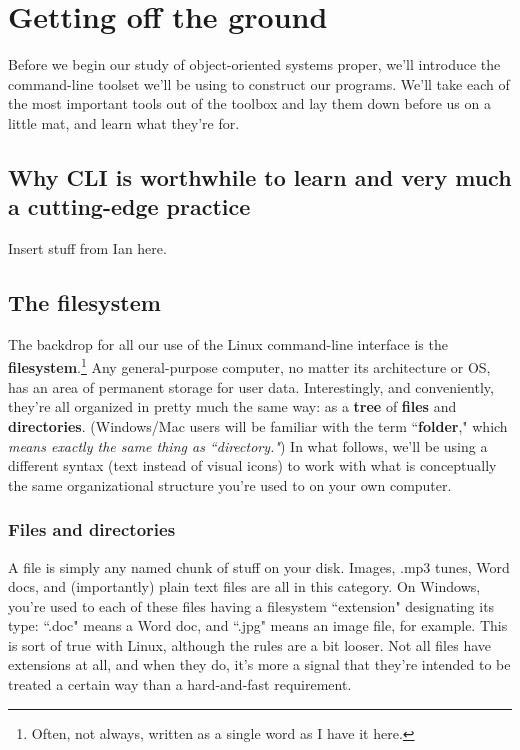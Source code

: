 
\chapter{Getting off the ground}

Before we begin our study of object-oriented systems proper, we'll introduce
the command-line toolset we'll be using to construct our programs. We'll take
each of the most important tools out of the toolbox and lay them down before
us on a little mat, and learn what they're for.

\section{Why CLI is worthwhile to learn and very much a cutting-edge practice}

Insert stuff from Ian here.

\section{The filesystem}

The backdrop for all our use of the Linux command-line interface is the
\textbf{filesystem}.\footnote{Often, not always, written as a single word as I
have it here.} Any general-purpose computer, no matter its architecture or OS,
has an area of permanent storage for user data. Interestingly, and
conveniently, they're all organized in pretty much the same way: as a
\textbf{tree} of \textbf{files} and \textbf{directories}. (Windows/Mac users
will be familiar with the term ``\textbf{folder}," which \textit{means exactly
the same thing as ``directory."}) In what follows, we'll be using a different
syntax (text instead of visual icons) to work with what is conceptually the
same organizational structure you're used to on your own computer.

\subsection{Files and directories}

A file is simply any named chunk of stuff on your disk. Images, .mp3 tunes,
Word docs, and (importantly) plain text files are all in this category. On
Windows, you're used to each of these files having a filesystem ``extension"
designating its type: ``.doc" means a Word doc, and ``.jpg" means an image
file, for example. This is sort of true with Linux, although the rules are
a bit looser. Not all files have extensions at all, and when they do, it's
more a signal that they're intended to be treated a certain way than a
hard-and-fast requirement.

